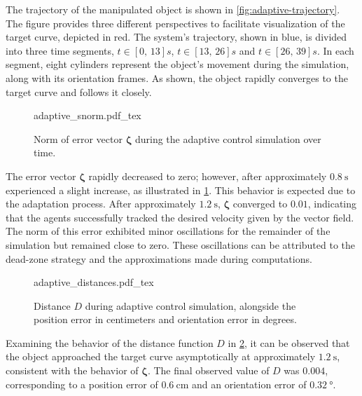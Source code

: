 The trajectory of the manipulated object is shown in \cref{fig:adaptive-trajectory}. The figure provides three different perspectives to facilitate visualization of the target curve, depicted in red. The system's trajectory, shown in blue, is divided into three time segments, $t\in[0,\,13]s$, $t\in[13,\,26]s$ and $t\in[26,\,39]s$. In each segment, eight cylinders represent the object's movement during the simulation, along with its orientation frames. As shown, the object rapidly converges to the target curve and follows it closely.

\begin{figure}[ht]
    \centering
    \def\svgwidth{\linewidth}
    {\footnotesize{adaptive_snorm.pdf_tex}}
    \caption{Norm of error vector $\boldsymbol{\zeta}$ during the adaptive control simulation over time.}
    \label{fig:sim2-snorm}
\end{figure}
The error vector $\boldsymbol{\zeta}$ rapidly decreased to zero; however, after approximately $\qty{0.8}{\second}$ experienced a slight increase, as illustrated in \cref{fig:sim2-snorm}. This behavior is expected due to the adaptation process. After approximately $\qty{1.2}{\second}$, $\boldsymbol{\zeta}$ converged to $\num{0.01}$, indicating that the agents successfully tracked the desired velocity given by the vector field. The norm of this error exhibited minor oscillations for the remainder of the simulation but remained close to zero. These oscillations can be attributed to the dead-zone strategy and the approximations made during computations.

\begin{figure}[ht]
    \centering
    \def\svgwidth{\linewidth}
    {\footnotesize{adaptive_distances.pdf_tex}}
    \caption{Distance $D$ during adaptive control simulation, alongside the position error in centimeters and orientation error in degrees.}
    \label{fig:sim2-distances}
\end{figure}
Examining the behavior of the distance function $D$ in \cref{fig:sim2-distances}, it can be observed that the object approached the target curve asymptotically at approximately $\qty{1.2}{\second}$, consistent with the behavior of $\boldsymbol{\zeta}$. The final observed value of $D$ was $\num{0.004}$, corresponding to a position error of $\qty{0.6}{\centi\meter}$ and an orientation error of $\qty{0.32}{\degree}$.

